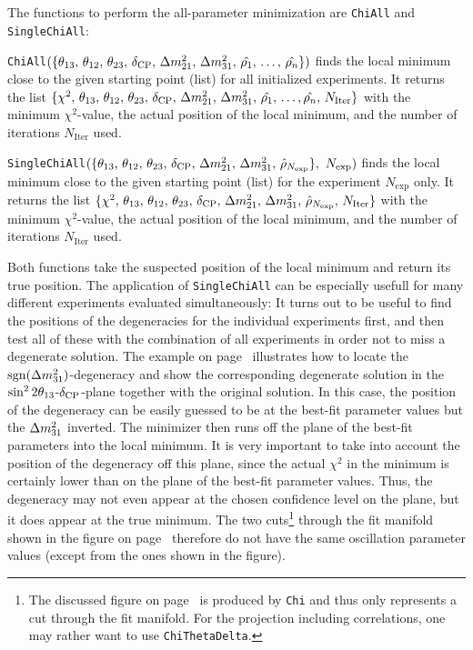The functions to perform the all-parameter minimization are {\tt ChiAll} and {\tt SingleChiAll}:
\begin{function}
{\tt ChiAll}$(\{ \theta_{13}, \, \theta_{12}, \, \theta_{23}, \, \delta_{\mathrm{CP}} , \, \Delta m_{21}^2 , \, \Delta m_{31}^2,  \, \hat{\rho_1}, \, \hdots , \, \hat{\rho_n} \})$ finds the local minimum close to the given starting point (list) for all initialized experiments. It returns the list  $\{ \chi^2, \, \theta_{13}, \, \theta_{12}, \, \theta_{23}, \, \delta_{\mathrm{CP}} , \, \Delta m_{21}^2 , \,  \Delta m_{31}^2,  \, \hat{\rho_1}, \, \hdots , \hat{\rho_n} , \, N_{\mathrm{Iter}} \}$ with the minimum $\chi^2$-value, the actual position of the local minimum, and the number of iterations $N_{\mathrm{Iter}}$ used.
\end{function}
\begin{function}
{\tt SingleChiAll}$( \{ \theta_{13}, \, \theta_{12}, \, \theta_{23}, \, \delta_{\mathrm{CP}} , \, \Delta m_{21}^2 , \, \Delta m_{31}^2, \,   \hat{\rho}_{N_{\mathrm{exp}}} \}, \, \, N_{\mathrm{exp}})$ finds the local minimum close to the given starting point (list) for the experiment $N_{\mathrm{exp}}$ only. It returns the list
 $\{ \chi^2, \, \theta_{13}, \, \theta_{12}, \, \theta_{23}, \, \delta_{\mathrm{CP}} , \, \Delta m_{21}^2 , \, \Delta m_{31}^2, \, \hat{\rho}_{N_{\mathrm{exp}}} ,  \, N_{\mathrm{Iter}} \}$ with the minimum $\chi^2$-value, the actual position of the local minimum, and the number of iterations $N_{\mathrm{Iter}}$ used.
\end{function}
%
Both functions take the suspected position of the local minimum and return its true position. The application of  {\tt SingleChiAll} can be especially usefull for many different experiments evaluated simultaneously: It turns out to be useful to find the positions of the degeneracies for the individual experiments first, and then test all of these with the combination of all experiments in order not to miss a degenerate solution. The example on page~\pageref{ex:sgndeg} illustrates how to locate the $\mathrm{sgn}(\Delta m_{31}^2)$-degeneracy and show the corresponding degenerate solution in the $\sin^2 2 \theta_{13}$-$\delta_{\mathrm{CP}}$-plane together with the original solution.
In this case, the position of the degeneracy can be easily guessed to be at the best-fit parameter values but the $\Delta m_{31}^2$ inverted. The minimizer then runs off the plane of the best-fit parameters into the local minimum. It is very important to take into account the position of the degeneracy off this plane, since the actual $\chi^2$ in the minimum is certainly lower than on the plane of the best-fit parameter values. Thus, the degeneracy may not even appear at the chosen confidence level on the plane, but it does appear at the true minimum. The two cuts\footnote{The discussed figure on page~\pageref{ex:sgndeg} is produced by  {\tt Chi} and thus only represents a cut through the fit manifold. For the projection including correlations, one may rather want to use {\tt ChiThetaDelta}.} through the fit manifold shown in the figure on page~\pageref{ex:sgndeg} therefore do not have the same oscillation parameter values (except from the ones shown in the figure). 

